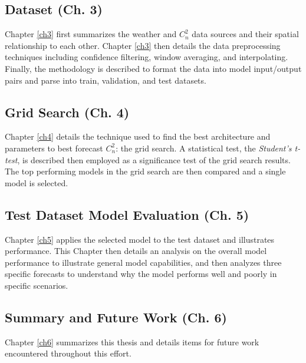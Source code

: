 \subsection{Dataset (Ch. 3)}
Chapter \ref{ch3} first summarizes the weather and $C_{n}^{2}$ data sources and their spatial relationship to each other. Chapter \ref{ch3} then details the data preprocessing techniques including confidence filtering, window averaging, and interpolating. Finally, the methodology is described to format the data into model input/output pairs and parse into train, validation, and test datasets.

\subsection{Grid Search (Ch. 4)}
Chapter \ref{ch4} details the technique used to find the best architecture and parameters to best forecast $C_{n}^{2}$: the grid search. A statistical test, the \textit{Student's t-test}, is described then employed as a significance test of the grid search results. The top performing models in the grid search are then compared and a single model is selected.

\subsection{Test Dataset Model Evaluation (Ch. 5)}
Chapter \ref{ch5} applies the selected model to the test dataset and illustrates performance. This Chapter then details an analysis on the overall model performance to illustrate general model capabilities, and then analyzes three specific forecasts to understand why the model performs well and poorly in specific scenarios.

\subsection{Summary and Future Work (Ch. 6)}
Chapter \ref{ch6} summarizes this thesis and details items for future work encountered throughout this effort.